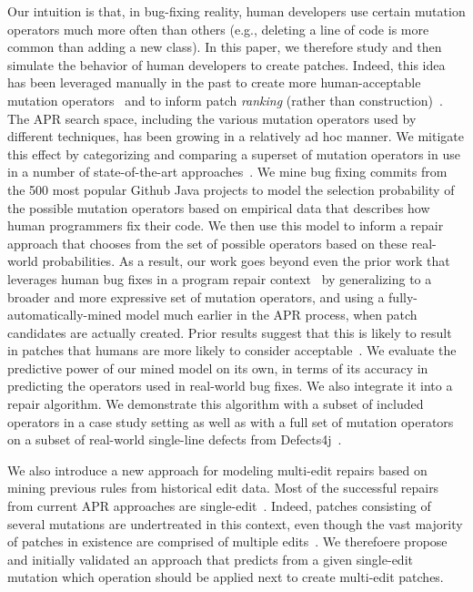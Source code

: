 \documentclass[conference]{IEEEtran}
\begin{document}
Our intuition is that, in bug-fixing reality, human developers use certain mutation operators 
much more often than 
others (e.g., deleting a line of code is more common than adding a
new class). In this paper, we therefore study and then simulate the behavior of human
developers to create patches. 
Indeed, this idea has been
leveraged manually in the past to create more human-acceptable mutation
operators~\cite{kim2013} and to inform patch \emph{ranking} (rather than construction)~\cite{xuan16,long16proph}.
The APR search space, including the various mutation
operators used by different techniques, has been growing in a relatively ad hoc 
manner. We mitigate this effect by categorizing and comparing a superset of
mutation operators in use in a number of 
state-of-the-art approaches~\cite{legoues12,Weimer13,kim2013,long16proph}.
We mine bug fixing commits from 
the 500 most popular Github Java projects to model the selection probability of
the possible mutation operators based on 
empirical data that describes how human programmers fix their code.  We then use this
model to inform a repair approach that chooses from the set of possible
operators based on these real-world
probabilities.
As a result, our work goes beyond even the prior work that leverages human bug
fixes in a program repair context~\cite{kim2013,xuan16,long16proph} by generalizing
to a broader and more expressive set of
mutation operators, and using a fully-automatically-mined model much 
earlier in the APR process, when
patch candidates are actually created.  Prior results suggest that this is likely to result in patches that
humans are more likely to consider acceptable~\cite{kim2013}.
%
We evaluate the predictive power of our mined model on its own, in terms of its
accuracy in predicting the operators used in real-world bug fixes.  We also
integrate it into a repair algorithm. We demonstrate this algorithm with a
subset of included operators in 
a case study setting as well as with a full set of mutation
operators on a subset of real-world single-line defects
from Defects4j~\cite{just14}. 

We also introduce a new approach for modeling multi-edit repairs based on
mining previous rules from historical edit data. Most of the
successful repairs from current APR approaches are
single-edit~\cite{Weimer13,Qi15,kim2013,arcuri11}.  
%
Indeed, patches
consisting of several mutations are undertreated in this context, even though the vast majority
of patches in existence are comprised of multiple edits~\cite{Soto15,zhong15}.
We therefoere
 propose and initially validated an approach that predicts from a given 
single-edit mutation which operation should be applied
next to create multi-edit patches. 
\end{document}

